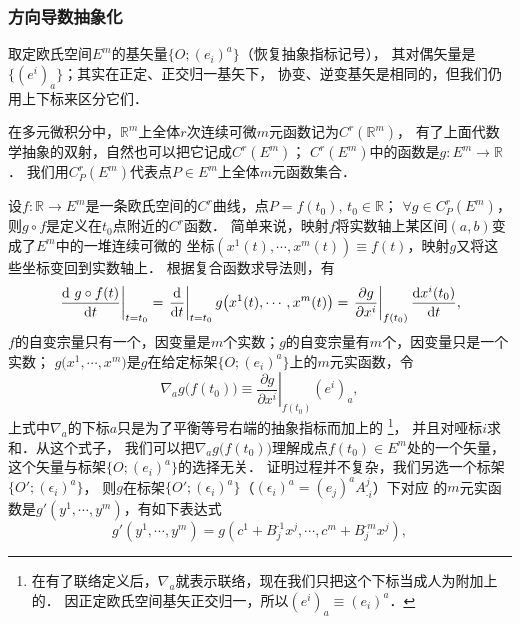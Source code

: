 \subsubsection{方向导数抽象化}\label{chdm:sec_ed}
取定欧氏空间$E^m$的基矢量$\{O;(e_i)^a\}$（恢复抽象指标记号），
其对偶矢量是$\{(e^i)_a\}$；其实在正定、正交归一基矢下，
协变、逆变基矢是相同的，但我们仍用上下标来区分它们．

在多元微积分中，$\mathbb{R}^m$上全体$r$次连续可微$m$元函数记为$C^r(\mathbb{R}^m)$，
有了上面代数学抽象的双射，自然也可以把它记成$C^r(E^m)$；
$C^r(E^m)$中的函数是$g:E^m \to \mathbb{R}$．
我们用$C^r_P(E^m)$代表点$P\in E^m$上全体$m$元函数集合．

设$f:\mathbb{R}\to E^m$是一条欧氏空间的$C^r$曲线，点$P=f(t_0),\, t_0\in \mathbb{R}$；
$\forall g\in C^r_P(E^m)$，则$g\circ f$是定义在$t_0$点附近的$C^r$函数．
简单来说，映射$f$将实数轴上某区间$(a,b)$变成了$E^m$中的一堆连续可微的
坐标$(x^1(t),\cdots, x^m(t))\equiv f(t)$，映射$g$又将这些坐标变回到实数轴上．
根据复合函数求导法则，有
\begin{equation}\label{chdm:eqn_dgf}
    \left.\frac{{\rm d}\ g\circ f(t)}{{\rm d}t}\right| _{t=t_0} =
     \left.\frac{{\rm d} }{{\rm d}t}\right| _{t=t_0}
     g\bigl(x^1(t),\cdots, x^m(t)\bigr)
     =\left.\frac{\partial g}{\partial x^i}\right| _{f(t_0)}
     \frac{{\rm d} x^i(t_0)}{{\rm d}t} ,
\end{equation}
$f$的自变宗量只有一个，因变量是$m$个实数；$g$的自变宗量有$m$个，因变量只是一个实数；
$g\bigl(x^1,\cdots, x^m\bigr)$是$g$在给定标架$\{O;(e_i)^a\}$上的$m$元实函数，令
\begin{equation}\label{chdm:eqn_ngea}
    \nabla_a g\bigl(f(t_0)\bigr) \equiv 
    \left.\frac{\partial g}{\partial x^i}\right| _{f(t_0)}(e^i)_a ,
\end{equation}
上式中$\nabla_a$的下标$a$只是为了平衡等号右端的抽象指标而加上的
{\footnote{在有了联络定义后，$\nabla_a$就表示联络，现在我们只把这个下标当成人为附加上的．
因正定欧氏空间基矢正交归一，所以$(e^i)_a\equiv (e_i)^a$．}}，
并且对哑标$i$求和．从这个式子，
我们可以把$\nabla_a g\bigl(f(t_0)\bigr)$理解成点$f(t_0)\in E^m$处的一个矢量，
这个矢量与标架$\{O;(e_i)^a\}$的选择无关．
证明过程并不复杂，我们另选一个标架$\{O';(\epsilon_i)^a\}$，
则$g$在标架$\{O';(\epsilon_i)^a\}$（$(\epsilon_i)^a=(e_j)^a A^j_{\cdot i}$）下对应
的$m$元实函数是$g'(y^1,\cdots,y^m)$，有如下表达式
\begin{equation}\label{chdm:eqn_gpgB}
    g'(y^1,\cdots,y^m)=g(c^1+B^{\cdot 1}_j x^j,\cdots,c^m+B^{\cdot m}_j x^j) ,
\end{equation}
